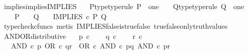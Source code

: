 \begin{isabellebody}
%
\isadelimproof
\isanewline
%
\endisadelimproof
\isanewline
{}\isamarkupfalse%
\ implies{\isacharunderscore}{\kern0pt}implies{\isacharunderscore}{\kern0pt}IMPLIES{\isacharcolon}{\kern0pt}\isanewline
\ \ \ P{\isacharunderscore}{\kern0pt}type{\isacharbrackleft}{\kern0pt}type{\isacharunderscore}{\kern0pt}rule{\isacharbrackright}{\kern0pt}{\isacharcolon}{\kern0pt}\ {\isachardoublequoteopen}P\ {\isacharcolon}{\kern0pt}\ one\ {\isasymrightarrow}\ {\isasymOmega}{\isachardoublequoteclose}\ \ Q{\isacharunderscore}{\kern0pt}type{\isacharbrackleft}{\kern0pt}type{\isacharunderscore}{\kern0pt}rule{\isacharbrackright}{\kern0pt}{\isacharcolon}{\kern0pt}\ {\isachardoublequoteopen}Q\ {\isacharcolon}{\kern0pt}\ one\ {\isasymrightarrow}\ {\isasymOmega}{\isachardoublequoteclose}\isanewline
\ \ \ \ {\isachardoublequoteopen}{\isacharparenleft}{\kern0pt}P\ {\isacharequal}{\kern0pt}\ {\isasymt}\ {\isasymLongrightarrow}\ Q\ {\isacharequal}{\kern0pt}\ {\isasymt}{\isacharparenright}{\kern0pt}\ {\isasymLongrightarrow}\ IMPLIES\ {\isasymcirc}\isactrlsub c\ {\isasymlangle}P{\isacharcomma}{\kern0pt}\ Q{\isasymrangle}\ {\isacharequal}{\kern0pt}\ {\isasymt}{\isachardoublequoteclose}\isanewline
%
\isadelimproof
\ \ %
\endisadelimproof
%
\isatagproof
{}\isamarkupfalse%
\ {\isacharparenleft}{\kern0pt}typecheck{\isacharunderscore}{\kern0pt}cfuncs{\isacharcomma}{\kern0pt}\ metis\ IMPLIES{\isacharunderscore}{\kern0pt}false{\isacharunderscore}{\kern0pt}is{\isacharunderscore}{\kern0pt}true{\isacharunderscore}{\kern0pt}false\ true{\isacharunderscore}{\kern0pt}false{\isacharunderscore}{\kern0pt}only{\isacharunderscore}{\kern0pt}truth{\isacharunderscore}{\kern0pt}values{\isacharparenright}{\kern0pt}%
\endisatagproof
{\isafoldproof}%
%
\isadelimproof
%
\endisadelimproof
%
\isadelimdocument
%
\endisadelimdocument
%
\isatagdocument
%
\isamarkuptrue%
%
\endisatagdocument
{\isafolddocument}%
%
\isadelimdocument
%
\endisadelimdocument
{}\isamarkupfalse%
\ AND{\isacharunderscore}{\kern0pt}OR{\isacharunderscore}{\kern0pt}distributive{\isacharcolon}{\kern0pt}\isanewline
\ \ \ {\isachardoublequoteopen}p\ {\isasymin}\isactrlsub c\ {\isasymOmega}{\isachardoublequoteclose}\isanewline
\ \ \ {\isachardoublequoteopen}q\ {\isasymin}\isactrlsub c\ {\isasymOmega}{\isachardoublequoteclose}\isanewline
\ \ \ {\isachardoublequoteopen}r\ {\isasymin}\isactrlsub c\ {\isasymOmega}{\isachardoublequoteclose}\isanewline
\ \ \ {\isachardoublequoteopen}AND\ {\isasymcirc}\isactrlsub c\ {\isasymlangle}p{\isacharcomma}{\kern0pt}\ OR\ {\isasymcirc}\isactrlsub c\ {\isasymlangle}q{\isacharcomma}{\kern0pt}r{\isasymrangle}{\isasymrangle}\ {\isacharequal}{\kern0pt}\ OR\ {\isasymcirc}\isactrlsub c\ {\isasymlangle}AND\ {\isasymcirc}\isactrlsub c\ {\isasymlangle}p{\isacharcomma}{\kern0pt}q{\isasymrangle}{\isacharcomma}{\kern0pt}\ AND\ {\isasymcirc}\isactrlsub c\ {\isasymlangle}p{\isacharcomma}{\kern0pt}r{\isasymrangle}{\isasymrangle}{\isachardoublequoteclose}\isanewline

\end{isabellebody}
